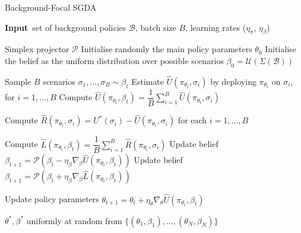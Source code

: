 \begin{algorithm}[h]

\caption{Background-Focal SGDA}
\label{algorithm:unknown_mdp_gda}

\begin{algorithmic}[1]
\STATE \textbf{Input\,} 
set of background policies $\mathcal{B}$, batch size $B$,
learning rates ($\eta_\pi$, $\eta_\beta$)

\STATE Simplex projector $\mathcal{P}$
\STATE Initialise randomly the main policy parameters $\theta_0$
\STATE Initialise the belief as the uniform distribution over possible scenarios $\beta_0 = \mathcal{U}(\Sigma(\mathcal{B}))$  


    \STATE Sample $B$ scenarios $\sigma_1, \dots, \sigma_B \sim \beta_t$
    \STATE Estimate $\hat U(\pi_{\theta_t}, \sigma_i)$ by deploying $\pi_{\theta_t}$ on $\sigma_i$, for  $i = 1, \dots, B$
    \STATE Compute $\hat U(\pi_{\theta_t}, \beta_t) = \dfrac{1}{B} \sum_{i=1}^{B} \hat U(\pi_{\theta_t}, \sigma_i)$
    
    \STATE Compute $\hat R(\pi_{\theta_t}, \sigma_i) = U^*(\sigma_i) - \hat U(\pi_{\theta_t}, \sigma_i)$ for each  $i = 1, \dots, B$

    \STATE Compute $\hat L(\pi_{\theta_t}, \beta_t) = \dfrac{1}{B} \sum_{i=1}^{B} \hat R(\pi_{\theta_t}, \sigma_i)$
        \STATE Update belief $\beta_{t+1} = \mathcal{P}(\beta_t - \eta_{\beta}\nabla_\beta \hat U(\pi_{\theta_t}, \beta_t))$
    \ENDIF
    \STATE Update belief $\beta_{t+1} = \mathcal{P}(\beta_t + \eta_{\beta}\nabla_\beta \hat L(\pi_{\theta_t}, \beta_t))$
    \ENDIF
    
    \STATE Update policy parameters $\theta_{t+1} = \theta_t + \eta_{\theta}\nabla_\theta \hat U(\pi_{\theta_t}, \beta_t)$
\ENDFOR

\RETURN $\theta^*, \beta^*$ uniformly at random from $\{(\theta_1, \beta_1), \dots, (\theta_N, \beta_N)\}$
\end{algorithmic}
\end{algorithm}